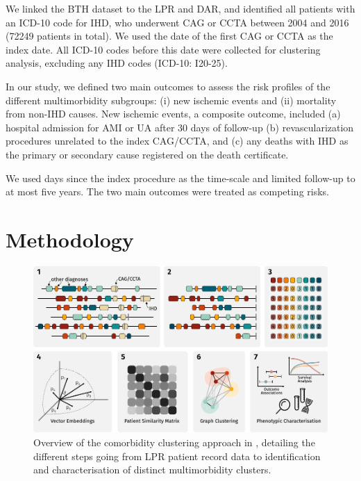 We linked the \ac{BTH} dataset to the \ac{LPR} and \ac{DAR}, 
and identified all patients with an \ac{ICD-10} code for \ac{IHD},
who underwent \ac{CAG} or \ac{CCTA} between 2004 and 2016 
(\num{72249} patients in total).
We used the date of the first \ac{CAG} or \ac{CCTA} as the index date. 
All \ac{ICD-10} codes before this date were collected
for clustering analysis, excluding any \ac{IHD} codes (\ac{ICD-10}: I20-25).

In our study, we defined two main outcomes to assess the risk
profiles of the different multimorbidity subgroups: (i) new ischemic events
and (ii) mortality from non-\ac{IHD} causes.
New ischemic events, a composite outcome, included 
(a) hospital admission for \ac{AMI} or \ac{UA} after 30 days of follow-up
(b) revascularization procedures unrelated to the index \ac{CAG}/\ac{CCTA},
and (c) any deaths with \ac{IHD} as the primary or secondary
cause registered on the death certificate.

We used days since the index procedure as the time-scale and limited 
follow-up to at most five years. The two main outcomes were treated
as competing risks.

\section{Methodology}

\begin{figure}[tp]
    \includegraphics{graphics/clustering-overview.pdf}
    \caption[Overview of Study I Methodology]{%
        Overview of the comorbidity clustering approach in \studyi{},
        detailing the different steps going from \ac{LPR} patient record data
        to identification and characterisation of distinct 
        multimorbidity clusters. 
    }
    \label{fig:dishisclust}
\end{figure}

